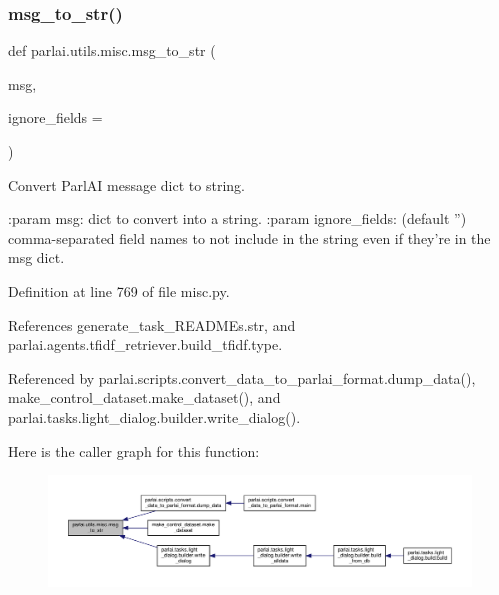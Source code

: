 \subsubsection{\texorpdfstring{msg\+\_\+to\+\_\+str()}{msg\_to\_str()}}
{\footnotesize\ttfamily def parlai.\+utils.\+misc.\+msg\+\_\+to\+\_\+str (\begin{DoxyParamCaption}\item[{}]{msg,  }\item[{}]{ignore\+\_\+fields = {\ttfamily \textquotesingle{}\textquotesingle{}} }\end{DoxyParamCaption})}

\begin{DoxyVerb}Convert ParlAI message dict to string.

:param msg:
    dict to convert into a string.
:param ignore_fields:
    (default '') comma-separated field names to not include in the string
    even if they're in the msg dict.
\end{DoxyVerb}
 

Definition at line 769 of file misc.\+py.



References generate\+\_\+task\+\_\+\+R\+E\+A\+D\+M\+Es.\+str, and parlai.\+agents.\+tfidf\+\_\+retriever.\+build\+\_\+tfidf.\+type.



Referenced by parlai.\+scripts.\+convert\+\_\+data\+\_\+to\+\_\+parlai\+\_\+format.\+dump\+\_\+data(), make\+\_\+control\+\_\+dataset.\+make\+\_\+dataset(), and parlai.\+tasks.\+light\+\_\+dialog.\+builder.\+write\+\_\+dialog().

Here is the caller graph for this function\+:
\nopagebreak
\begin{figure}[H]
\begin{center}
\leavevmode
\includegraphics[width=350pt]{namespaceparlai_1_1utils_1_1misc_ae5db473b41d3b49814e2566e866282b6_icgraph}
\end{center}
\end{figure}
\mbox{\label{namespaceparlai_1_1utils_1_1misc_a68c44ca571de7149b683539db659c330}} 
